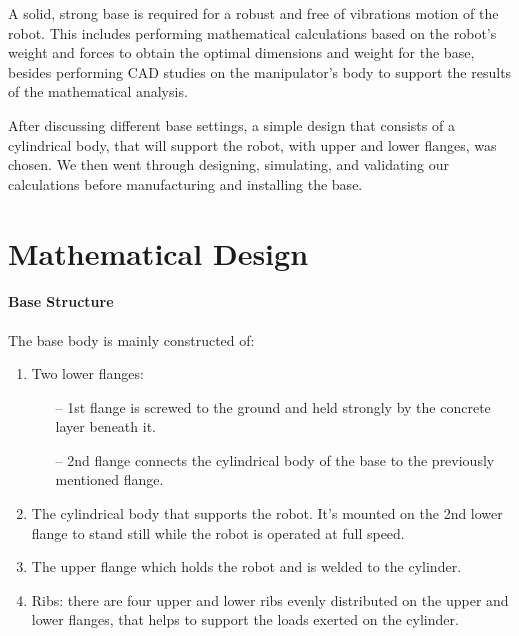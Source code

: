 
%
A solid, strong base is required for a robust and free of vibrations motion of the robot. This includes performing mathematical calculations based on the robot’s weight and forces to obtain the optimal dimensions and weight for the base, besides performing CAD studies on the manipulator’s body to support the results of the mathematical analysis. 

After discussing different base settings, a simple design that consists of a cylindrical body, that will support the robot, with upper and lower flanges, was chosen. We then went through designing, simulating, and validating our calculations before manufacturing and installing the base.



		
\section{Mathematical Design}

\paragraph{Base Structure}
The base body is mainly constructed of:
\begin{enumerate}
\item Two lower flanges:
	\begin{itemize}
	\item[--] 1st flange is screwed to the ground and held strongly by the concrete layer beneath it.
	\item[--] 2nd flange connects the cylindrical body of the base to the previously mentioned flange.
	\end{itemize}

\item The cylindrical body that supports the robot. It’s mounted on the 2nd lower flange to stand still while the robot is operated at full speed.

\item The upper flange which holds the robot and is welded to the cylinder.

\item Ribs: there are four upper and lower ribs evenly distributed on the upper and lower flanges, that helps to support the loads exerted on the cylinder.
\end{enumerate}

